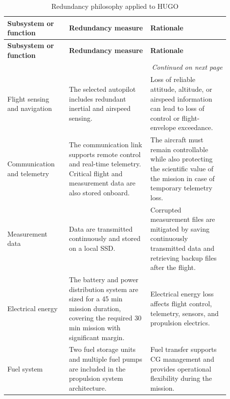 \begin{longtable}{|p{0.25\linewidth}|p{0.33\linewidth}|p{0.32\linewidth}|}
    \caption{Redundancy philosophy applied to HUGO}
    \label{tab:redundancy_philosophy} \\

    \hline
    \textbf{Subsystem or function} &
    \textbf{Redundancy measure} &
    \textbf{Rationale} \\
    \hline\hline
    \endfirsthead

    \hline
    \textbf{Subsystem or function} &
    \textbf{Redundancy measure} &
    \textbf{Rationale} \\
    \hline\hline
    \endhead

    \hline
    \multicolumn{3}{r}{\textit{Continued on next page}} \\
    \hline
    \endfoot

    \hline
    \endlastfoot

    Flight sensing and navigation &
    The selected autopilot includes redundant inertial and airspeed sensing. &
    Loss of reliable attitude, altitude, or airspeed information can lead to loss of control or flight-envelope exceedance. \\
    \hline

    Communication and telemetry &
    The communication link supports remote control and real-time telemetry. Critical flight and measurement data are also stored onboard. &
    The aircraft must remain controllable while also protecting the scientific value of the mission in case of temporary telemetry loss. \\
    \hline

    Measurement data &
    Data are transmitted continuously and stored on a local SSD. &
    Corrupted measurement files are mitigated by saving continuously transmitted data and retrieving backup files after the flight. \\
    \hline

    Electrical energy &
    The battery and power distribution system are sized for a 45 min mission duration, covering the required 30 min mission with significant margin. &
    Electrical energy loss affects flight control, telemetry, sensors, and propulsion electrics. \\
    \hline

    Fuel system &
    Two fuel storage units and multiple fuel pumps are included in the propulsion system architecture. &
    Fuel transfer supports CG management and provides operational flexibility during the mission. \\
    \hline


\end{longtable}
